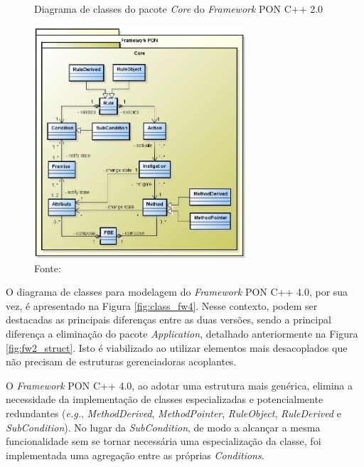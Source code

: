 \begin{figure}[!htb]
    \centering
    \caption{Diagrama de classes do pacote \textit{Core} do \textit{Framework}
        PON C++ 2.0} \includegraphics[width=0.7\textwidth]{../figures/fw2_core.PNG}
    \smallskip
    \caption*{Fonte: }
    \label{fig:class_fw2_core}
\end{figure}



O diagrama de classes para modelagem do \textit{Framework} PON C++ 4.0, por sua
vez, é apresentado na Figura \ref{fig:class_fw4}. Nesse contexto, podem
ser destacadas as principais diferenças entre as duas versões, sendo a principal
diferença a eliminação do pacote \textit{Application}, detalhado anteriormente
na Figura \ref{fig:fw2_struct}. Isto é viabilizado ao utilizar elementos
mais desacoplados que não precisam de estruturas gerenciadoras acoplantes.

O \textit{Framework} PON C++ 4.0, ao adotar uma estrutura mais genérica, elimina
a necessidade da implementação de classes especializadas e potencialmente
redundantes (\textit{e.g.}, \textit{MethodDerived}, \textit{MethodPointer},
\textit{RuleObject}, \textit{RuleDerived} e \textit{SubCondition}). No lugar da
\textit{SubCondition}, de modo a alcançar a mesma funcionalidade sem se tornar
necessária uma especialização da classe, foi implementada uma agregação entre as
próprias \textit{Conditions}.

